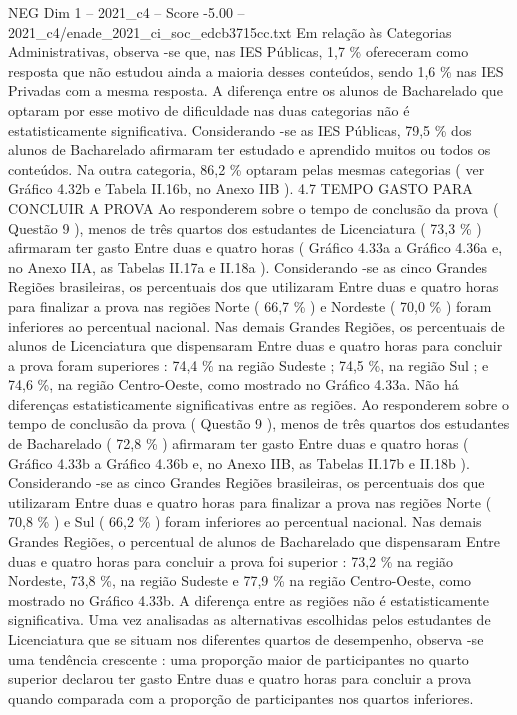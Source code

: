 \begin{textsample}{NEG Dim 1 – 2021\_c4 – Score -5.00 – 2021\_c4/enade\_2021\_ci\_soc\_edcb3715cc.txt}
Em relação às Categorias Administrativas, observa -se que, nas IES Públicas, 1,7 \% ofereceram como resposta que não estudou ainda a maioria desses conteúdos, sendo 1,6 \% nas IES Privadas com a mesma resposta.
A diferença entre os alunos de Bacharelado que optaram por esse motivo de dificuldade nas duas categorias não é estatisticamente significativa.
Considerando -se as IES Públicas, 79,5 \% dos alunos de Bacharelado afirmaram ter estudado e aprendido muitos ou todos os conteúdos.
Na outra categoria, 86,2 \% optaram pelas mesmas categorias ( ver Gráfico 4.32b e Tabela II.16b, no Anexo IIB ). 4.7 TEMPO GASTO PARA CONCLUIR A PROVA Ao responderem sobre o tempo de conclusão da prova ( Questão 9 ), menos de três quartos dos estudantes de Licenciatura ( 73,3 \% ) afirmaram ter gasto Entre duas e quatro horas ( Gráfico 4.33a a Gráfico 4.36a e, no Anexo IIA, as Tabelas II.17a e II.18a ).
Considerando -se as cinco Grandes Regiões brasileiras, os percentuais dos que utilizaram Entre duas e quatro horas para finalizar a prova nas regiões Norte ( 66,7 \% ) e Nordeste ( 70,0 \% ) foram inferiores ao percentual nacional.
Nas demais Grandes Regiões, os percentuais de alunos de Licenciatura que dispensaram Entre duas e quatro horas para concluir a prova foram superiores : 74,4 \% na região Sudeste ; 74,5 \%, na região Sul ; e 74,6 \%, na região Centro-Oeste, como mostrado no Gráfico 4.33a.
Não há diferenças estatisticamente significativas entre as regiões.
Ao responderem sobre o tempo de conclusão da prova ( Questão 9 ), menos de três quartos dos estudantes de Bacharelado ( 72,8 \% ) afirmaram ter gasto Entre duas e quatro horas ( Gráfico 4.33b a Gráfico 4.36b e, no Anexo IIB, as Tabelas II.17b e II.18b ).
Considerando -se as cinco Grandes Regiões brasileiras, os percentuais dos que utilizaram Entre duas e quatro horas para finalizar a prova nas regiões Norte ( 70,8 \% ) e Sul ( 66,2 \% ) foram inferiores ao percentual nacional.
Nas demais Grandes Regiões, o percentual de alunos de Bacharelado que dispensaram Entre duas e quatro horas para concluir a prova foi superior : 73,2 \% na região Nordeste, 73,8 \%, na região Sudeste e 77,9 \% na região Centro-Oeste, como mostrado no Gráfico 4.33b.
A diferença entre as regiões não é estatisticamente significativa.
Uma vez analisadas as alternativas escolhidas pelos estudantes de Licenciatura que se situam nos diferentes quartos de desempenho, observa -se uma tendência crescente : uma proporção maior de participantes no quarto superior declarou ter gasto Entre duas e quatro horas para concluir a prova quando comparada com a proporção de participantes nos quartos inferiores.

\end{textsample}
